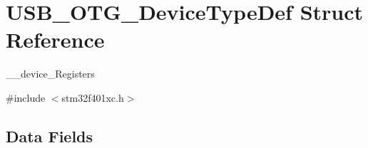 \hypertarget{struct_u_s_b___o_t_g___device_type_def}{}\section{U\+S\+B\+\_\+\+O\+T\+G\+\_\+\+Device\+Type\+Def Struct Reference}
\label{struct_u_s_b___o_t_g___device_type_def}


\+\_\+\+\_\+device\+\_\+\+Registers  




{\ttfamily \#include $<$stm32f401xc.\+h$>$}

\subsection*{Data Fields}
